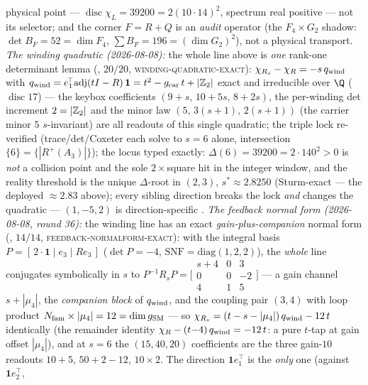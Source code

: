 \begin{winbox}
physical point --- $\operatorname{disc}\chi_L=39200=2(10\cdot14)^2$, spectrum real positive --- not its
selector; and the corner $F=R{+}Q$ is an \emph{audit} operator (the $F_4{\times}G_2$ shadow:
$\det B_F=52=\dim F_4$, $\sum B_F=196=(\dim G_2)^2$), not a physical transport.
\emph{The winding quadratic (2026-08-08):} the whole line above is \emph{one} rank-one determinant lemma
(, $20/20$, \textsc{winding-quadratic-exact}):
$\chi_{R_s} - \chi_R = -s\,q_{\rm wind}$ with
$q_{\rm wind} = e_1^{\!\top}\mathrm{adj}(tI - R)\,\mathbf 1 = t^2 - g_{\mathrm{car}}\,t + |\mathbb{Z}_2|$
exact and irreducible over $\Q$ ($\operatorname{disc} 17$) --- the keybox coefficients
$(9{+}s,\, 10{+}5s,\, 8{+}2s)$, the per-winding det increment $2 = |\mathbb{Z}_2|$ and the minor law
$(5,\, 3(s{+}1),\, 2(s{+}1))$ (the carrier minor $5$ $s$-invariant) are all readouts of this single
quadratic; the triple lock re-verified (trace/det/Coxeter each solve to $s = 6$ alone, intersection
$\{6\} = \{|R^+(A_3)|\}$); the locus typed exactly: $\Delta(6) = 39200 = 2\cdot140^2 > 0$ is \emph{not} a
collision point and the sole $2{\times}$square hit in the integer window, and the reality threshold is
the unique $\Delta$-root in $(2,3)$, $s^* \approx 2.8250$ (Sturm-exact --- the deployed $\approx 2.83$
above); every sibling direction breaks the lock \emph{and} changes the quadratic --- $(1, -5, 2)$ is
direction-specific \mE.
\emph{The feedback normal form (2026-08-08, round 36):} the winding line has an exact
\emph{gain-plus-companion} normal form (, $14/14$,
\textsc{feedback-normalform-exact}): with the integral basis $P = [\,2\cdot\mathbf 1 \mid e_3 \mid
R e_3\,]$ ($\det P = -4$, $\mathrm{SNF} = \mathrm{diag}(1,2,2)$), the \emph{whole} line conjugates
symbolically in $s$ to $P^{-1} R_s P = \bigl[\begin{smallmatrix} s+4 & 0 & 3\\ 0 & 0 & -2\\ 4 & 1 & 5
\end{smallmatrix}\bigr]$ --- a gain channel $s + |\mu_4|$, the \emph{companion block} of $q_{\rm wind}$,
and the coupling pair $(3,4)$ with loop product $N_{\mathrm{fam}} \times |\mu_4| = 12 = \dim g_{\rm SM}$ --- so
$\chi_{R_s} = (t - s - |\mu_4|)\,q_{\rm wind} - 12\,t$ identically (the remainder identity
$\chi_R - (t{-}4)\,q_{\rm wind} = -12\,t$: a pure $t$-tap at gain offset $|\mu_4|$), and at $s = 6$ the
$(15, 40, 20)$ coefficients are the three gain-$10$ readouts $10{+}5$, $50{+}2{-}12$, $10\times2$.  The
direction $\mathbf 1 e_1^{\!\top}$ is the \emph{only} one (against $\mathbf 1 e_2^{\!\top}$,

\end{winbox}
